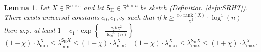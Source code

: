 \documentclass[11pt]{article}
\newtheorem{lem}{Lemma}
\theoremstyle{definition}
\theoremstyle{plain}
\providecommand{\definitionref}[1]
{Definition~\ref{#1}}
\newcommand{\reals}{\mathbb{R}}
\begin{document}
\begin{lem}
    \label{lem:SRHT_preserves_lambda_min} 
    Let $X \in \reals^{n\times d}$ and let $\mathsf{S}_{\mathrm{H}} \in \reals^{k\times n}$ be  sketch (\definitionref{defn:SRHT}). There exists universal constants $c_0, c_1, c_2$ such that if $k \geq \frac{c_0\cdot\mathrm{rank}(X)}{\chi^2}\cdot \log^4(n)$ then w.p. at least $1 - c_1 \cdot \exp\left\{-\frac{c_2 k\chi^2}{\log^4(n)}\right\}$  
    \begin{equation}
        \left(1 - \chi\right)\cdot \lambda^{X}_{\min} \leq \lambda^{\mathsf{S}_{\mathrm{H}}X}_{\min} \leq \left(1 + \chi\right)\cdot \lambda^{X}_{\min},\ \ \ \left(1 - \chi\right)\cdot \lambda^{X}_{\max} \leq \lambda^{\mathsf{S}_{\mathrm{H}}X}_{\max} \leq \left(1 + \chi\right)\cdot \lambda^{X}_{\max}.
    \end{equation}
\end{lem}
\end{document}

